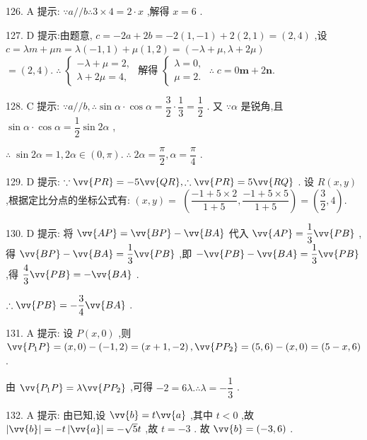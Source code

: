 126. A 提示: $\because a//b\therefore 3 \times  4 = 2 \cdot  x$ ,解得 $x = 6$ .

127. D 提示:由题意, $c =  - {2a} + {2b} =  - 2\left( {1, - 1}\right)  + 2\left( {2,1}\right)  = \left( {2,4}\right)$ ,设 $c = {\lambda m} + {\mu n} = \lambda \left( {-1,1}\right)  + \mu \left( {1,2}\right)  = \left( {-\lambda  + \mu ,\lambda  + {2\mu }}\right)$  $= \left( {2,4}\right) .\;\therefore \;\left\{  {\begin{array}{l}  - \lambda  + \mu  = 2, \\  \lambda  + {2\mu } = 4, \end{array}\text{ 解得 }\left\{  {\begin{array}{l} \lambda  = 0, \\  \mu  = 2. \end{array}\;\therefore \;c = 0\mathbf{m} + 2\mathbf{n}.}\right. }\right.$

128. C 提示: $\because a//b,\therefore \sin \alpha  \cdot  \cos \alpha  = \dfrac{3}{2} \cdot  \dfrac{1}{3} = \dfrac{1}{2}$ . 又 $\because \alpha$ 是锐角,且 $\sin \alpha  \cdot  \cos \alpha  = \dfrac{1}{2}\sin {2\alpha }$ ,

$\therefore \;\sin {2\alpha } = 1,{2\alpha } \in  \left( {0,\pi }\right) .\;\therefore \;{2\alpha } = \dfrac{\pi }{2},\alpha  = \dfrac{\pi }{4}$ .

129. D 提示: $\because \vv{PR} =  - 5\vv{QR},\therefore \vv{PR} = 5\vv{RQ}$ . 设 $R\left( {x,y}\right)$ ,根据定比分点的坐标公式有: $\left( {x,y}\right)  =$  $\left( {\dfrac{-1 + 5 \times  2}{1 + 5},\dfrac{-1 + 5 \times  5}{1 + 5}}\right)  = \left( {\dfrac{3}{2},4}\right) .$

130. D 提示: 将 $\vv{AP} = \vv{BP} - \vv{BA}$ 代入 $\vv{AP} = \dfrac{1}{3}\vv{PB}$ ,得 $\vv{BP} - \vv{BA} = \dfrac{1}{3}\vv{PB}$ ,即 $- \vv{PB} - \vv{BA} = \dfrac{1}{3}\vv{PB}$ ,得 $\dfrac{4}{3}\vv{PB} =  - \vv{BA}$ .

$\therefore \vv{PB} =  - \dfrac{3}{4}\vv{BA}$ .

131. A 提示: 设 $P\left( {x,0}\right)$ ,则 $\vv{{P}_{1}P} = \left( {x,0}\right)  - \left( {-1,2}\right)  = \left( {x + 1, - 2}\right) ,\vv{P{P}_{2}} = \left( {5,6}\right)  - \left( {x,0}\right)  = \left( {5 - x,6}\right)$ .

由 $\vv{{P}_{1}P} = \lambda \vv{P{P}_{2}}$ ,可得 $- 2 = {6\lambda }.\therefore \lambda  =  - \dfrac{1}{3}$ .

132. A 提示: 由已知,设 $\vv{b} = t\vv{a}$ ,其中 $t < 0$ ,故 $\left| \vv{b}\right|  =  - t\left| \vv{a}\right|  =  - \sqrt{5}t$ ,故 $t =  - 3$ . 故 $\vv{b} = \left( {-3,6}\right)$ .

